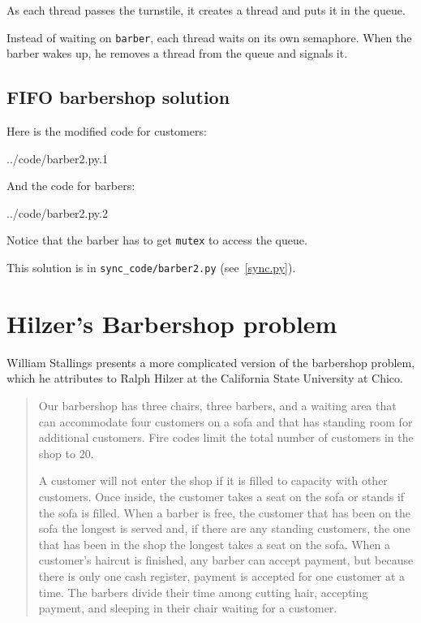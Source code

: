 \documentclass{book}
\newcommand{\clearemptydoublepage}{\newpage\cleardoublepage}
\begin{document}
As each thread passes the turnstile, it creates a thread and puts it
in the queue.

Instead of waiting on {\tt barber}, each thread waits on its own
semaphore.  When the barber wakes up, he removes a thread from the queue and
signals it.


\clearemptydoublepage
\subsection{FIFO barbershop solution}

Here is the modified code for customers:


{../code/barber2.py.1}

And the code for barbers:


{../code/barber2.py.2}

Notice that the barber has to get {\tt mutex} to access the
queue.

This solution is in \verb"sync_code/barber2.py" (see~\ref{sync.py}).


\clearemptydoublepage
\section {Hilzer's Barbershop problem}

William Stallings \cite{stallings} presents a more complicated version
of the barbershop problem, which he attributes to Ralph Hilzer at the
California State University at Chico.

\begin{quotation}
Our barbershop has three chairs, three barbers, and a waiting
area that can accommodate four customers on a sofa and that has
standing room for additional customers.  Fire codes limit the
total number of customers in the shop to 20.

A customer will not enter the shop if it is filled to capacity with
other customers.  Once inside, the customer takes a seat on the sofa
or stands if the sofa is filled.  When a barber is free, the customer
that has been on the sofa the longest is served and, if there are any
standing customers, the one that has been in the shop the longest
takes a seat on the sofa.  When a customer's haircut is finished, any
barber can accept payment, but because there is only one cash
register, payment is accepted for one customer at a time.  The barbers
divide their time among cutting hair, accepting payment, and sleeping
in their chair waiting for a customer.
\end{quotation}
\end{document}
